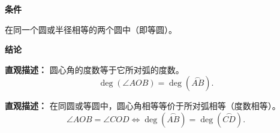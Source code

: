 \begin{statementbox}
	\textbf{\textcolor{CStatement}{条件}}
	\begin{description}[style=nextline, leftmargin=2.8em, labelsep=0.5em, itemsep=0.35em]
		\item[\textbf{\textcolor{CStatement}{条件1（同圆等圆）：}}] 在同一个圆或半径相等的两个圆中（即等圆）。
	\end{description}

	\textbf{\textcolor{CStatement}{结论}}
	\begin{description}[style=nextline, leftmargin=2.8em, labelsep=0.5em, itemsep=0.45em]
		\item[\textbf{\textcolor{CStatement}{结论一（圆心角定理）：}}]
			\textbf{\textcolor{CStatement}{直观描述：}}
			圆心角的度数等于它所对弧的度数。
			\[
				\deg(\angle AOB) = \deg(\overset{\frown}{AB}).
			\]

		\item[\textbf{\textcolor{CStatement}{推广结论（圆心角弧双向）：}}]
			\textbf{\textcolor{CStatement}{直观描述：}}
			在同圆或等圆中，圆心角相等等价于所对弧相等（度数相等）。
			\[
				\angle AOB = \angle COD \iff \deg(\overset{\frown}{AB}) = \deg(\overset{\frown}{CD}).
			\]
	\end{description}
\end{statementbox}
